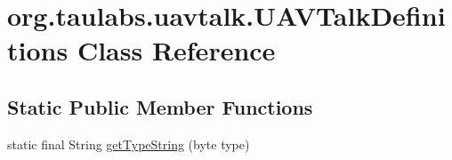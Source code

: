 \hypertarget{classorg_1_1taulabs_1_1uavtalk_1_1_u_a_v_talk_definitions}{\section{org.\-taulabs.\-uavtalk.\-U\-A\-V\-Talk\-Definitions \-Class \-Reference}
\label{classorg_1_1taulabs_1_1uavtalk_1_1_u_a_v_talk_definitions}
}
\subsection*{\-Static \-Public \-Member \-Functions}
\begin{DoxyCompactItemize}
\item 
static final \-String \hyperlink{classorg_1_1taulabs_1_1uavtalk_1_1_u_a_v_talk_definitions_a34571929ed6e8c37505c8434ee15508f}{get\-Type\-String} (byte type)
\end{DoxyCompactItemize}
